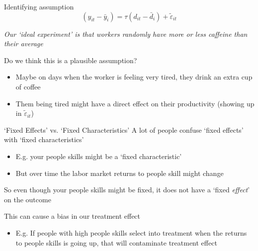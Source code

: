 \documentclass[aspectratio=169,t,11pt,table]{beamer}
\begin{document}
\begin{frame}{Identifying assumption}
  \vspace*{-\bigskipamount}
  $$
    \left(y_{it} - \bar{y}_i\right) = \tau \left(d_{it} - \bar{d}_i\right) + \tilde{\varepsilon}_{it}
  $$
  
  \emph{Our `ideal experiment' is that workers \emph{randomly} have more or less caffeine than their average}

  \bigskip
  Do we think this is a plausible assumption? 
  \pause
  \begin{itemize}
    \item Maybe on days when the worker is feeling very tired, they drink an extra cup of coffee
    \item Them being tired might have a direct effect on their productivity (showing up in $\tilde{\varepsilon}_{it}$)
  \end{itemize}
\end{frame}



\begin{frame}{`Fixed Effects' vs. `Fixed Characteristics'}
  A lot of people confuse `fixed effects' with `fixed characteristics'
  \begin{itemize}
    \item E.g. your people skills might be a `fixed characteristic'
    
    \item But over time the labor market returns to people skill might change
  \end{itemize}

  \bigskip
  So even though your people skills might be fixed, it does not have a `fixed \emph{effect}' on the outcome

  \pause
  \bigskip
  This can cause a bias in our treatment effect
  \begin{itemize}
    \item E.g. If people with high people skills select into treatment when the returns to people skills is going up, that will contaminate treatment effect
  \end{itemize}
\end{frame}
\end{document}
